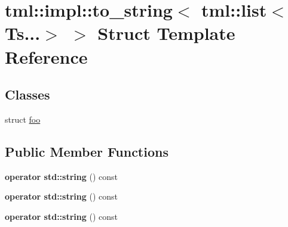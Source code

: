 \hypertarget{structtml_1_1impl_1_1to__string_3_01tml_1_1list_3_01Ts_8_8_8_4_01_4}{\section{tml\+:\+:impl\+:\+:to\+\_\+string$<$ tml\+:\+:list$<$ Ts...$>$ $>$ Struct Template Reference}
\label{structtml_1_1impl_1_1to__string_3_01tml_1_1list_3_01Ts_8_8_8_4_01_4}
}
\subsection*{Classes}
\begin{DoxyCompactItemize}
\item 
struct \hyperlink{structtml_1_1impl_1_1to__string_3_01tml_1_1list_3_01Ts_8_8_8_4_01_4_1_1foo}{foo}
\end{DoxyCompactItemize}
\subsection*{Public Member Functions}
\begin{DoxyCompactItemize}
\item 
\hypertarget{structtml_1_1impl_1_1to__string_3_01tml_1_1list_3_01Ts_8_8_8_4_01_4_aa6aa7110aaaf90f5457c003556e93d83}{{\bfseries operator std\+::string} () const }\label{structtml_1_1impl_1_1to__string_3_01tml_1_1list_3_01Ts_8_8_8_4_01_4_aa6aa7110aaaf90f5457c003556e93d83}

\item 
\hypertarget{structtml_1_1impl_1_1to__string_3_01tml_1_1list_3_01Ts_8_8_8_4_01_4_aa6aa7110aaaf90f5457c003556e93d83}{{\bfseries operator std\+::string} () const }\label{structtml_1_1impl_1_1to__string_3_01tml_1_1list_3_01Ts_8_8_8_4_01_4_aa6aa7110aaaf90f5457c003556e93d83}

\item 
\hypertarget{structtml_1_1impl_1_1to__string_3_01tml_1_1list_3_01Ts_8_8_8_4_01_4_aa6aa7110aaaf90f5457c003556e93d83}{{\bfseries operator std\+::string} () const }\label{structtml_1_1impl_1_1to__string_3_01tml_1_1list_3_01Ts_8_8_8_4_01_4_aa6aa7110aaaf90f5457c003556e93d83}

\end{DoxyCompactItemize}
